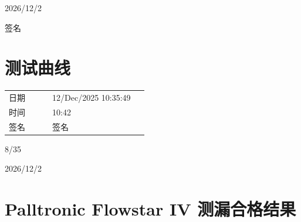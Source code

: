 \documentclass[UTF8,10pt,a4paper,fontset=fandol]{ctexart}
\newcommand{\fieldvalue}[1]{#1}
\newcommand{\handwritten}[1]{#1}
\begin{document}
\vspace{1em}

\handwritten{2026/12/2}

\handwritten{签名}

\section{测试曲线}

\begin{center}
\end{center}

\begin{tabular}{@{}p{0.28\linewidth}p{0.62\linewidth}@{}}
日期 &
\fieldvalue{12/Dec/2025 10:35:49}
\\[2pt]
时间 &
\fieldvalue{10:42}
\\[2pt]
签名 &
\fieldvalue{\handwritten{签名}}
\end{tabular}

\handwritten{8/35}

\handwritten{2026/12/2}

\newpage

\section{Palltronic Flowstar IV 测漏合格结果}
\end{document}
